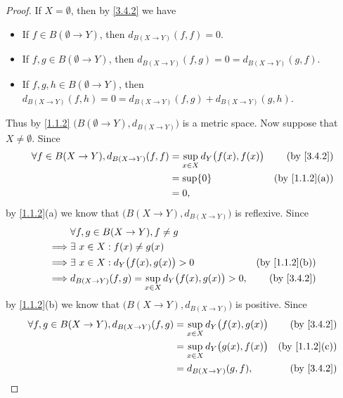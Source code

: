 \begin{proof}
  If \(X = \emptyset\), then by \cref{3.4.2} we have
  \begin{itemize}
    \item If \(f \in B(\emptyset \to Y)\), then \(d_{B(X \to Y)}(f, f) = 0\).
    \item If \(f, g \in B(\emptyset \to Y)\), then \(d_{B(X \to Y)}(f, g) = 0 = d_{B(X \to Y)}(g, f)\).
    \item If \(f, g, h \in B(\emptyset \to Y)\), then \(d_{B(X \to Y)}(f, h) = 0 = d_{B(X \to Y)}(f, g) + d_{B(X \to Y)}(g, h)\).
  \end{itemize}
  Thus by \cref{1.1.2} \(\big(B(\emptyset \to Y), d_{B(X \to Y)}\big)\) is a metric space.
  Now suppose that \(X \neq \emptyset\).
  Since
  \begin{align*}
    \forall f \in B(X \to Y), d_{B(X \to Y)}(f, f) & = \sup_{x \in X} d_Y\big(f(x), f(x)\big) & \text{(by \cref{3.4.2})}    \\
                                                   & = \sup \{0\}                             & \text{(by \cref{1.1.2}(a))} \\
                                                   & = 0,
  \end{align*}
  by \cref{1.1.2}(a) we know that \(\big(B(X \to Y), d_{B(X \to Y)}\big)\) is reflexive.
  Since
  \begin{align*}
             & \forall f, g \in B(X \to Y), f \neq g                                                            \\
    \implies & \exists\ x \in X : f(x) \neq g(x)                                                                \\
    \implies & \exists\ x \in X : d_Y\big(f(x), g(x)\big) > 0                     & \text{(by \cref{1.1.2}(b))} \\
    \implies & d_{B(X \to Y)}(f, g) = \sup_{x \in X} d_Y\big(f(x), g(x)\big) > 0, & \text{(by \cref{3.4.2})}
  \end{align*}
  by \cref{1.1.2}(b) we know that \(\big(B(X \to Y), d_{B(X \to Y)}\big)\) is positive.
  Since
  \begin{align*}
    \forall f, g \in B(X \to Y), d_{B(X \to Y)}(f, g) & = \sup_{x \in X} d_Y\big(f(x), g(x)\big) & \text{(by \cref{3.4.2})}    \\
                                                      & = \sup_{x \in X} d_Y\big(g(x), f(x)\big) & \text{(by \cref{1.1.2}(c))} \\
                                                      & = d_{B(X \to Y)}(g, f),                  & \text{(by \cref{3.4.2})}

\end{align*}
\end{proof}
